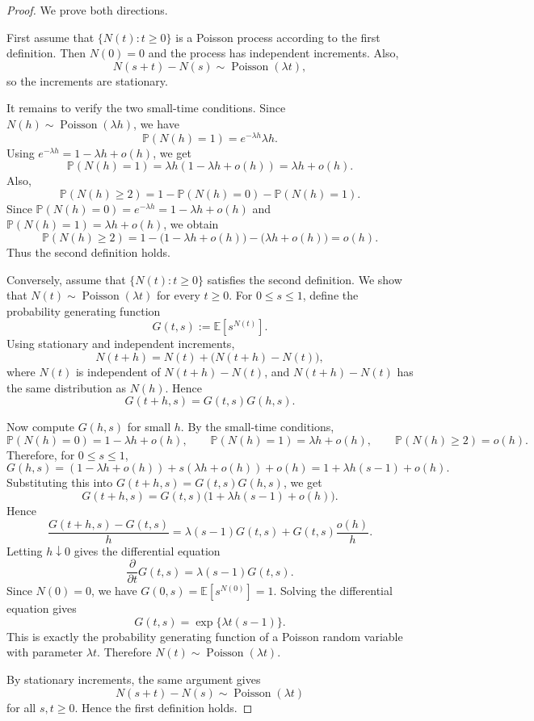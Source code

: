 \documentclass[11pt]{article}
\theoremstyle{plain}
\theoremstyle{definition}
\theoremstyle{remark}
\begin{document}
\begin{proof}
	We prove both directions.
	
	First assume that \(\{N(t):t\ge 0\}\) is a Poisson process according to the first definition. Then \(N(0)=0\) and the process has independent increments. Also,
	\[
	N(s+t)-N(s)
	\sim
	\operatorname{Poisson}(\lambda t),
	\]
	so the increments are stationary.
	
	It remains to verify the two small-time conditions. Since \(N(h)\sim \operatorname{Poisson}(\lambda h)\), we have
	\[
	\mathbb{P}(N(h)=1)=e^{-\lambda h}\lambda h.
	\]
	Using \(e^{-\lambda h}=1-\lambda h+o(h)\), we get
	\[
	\mathbb{P}(N(h)=1)
	=
	\lambda h(1-\lambda h+o(h))
	=
	\lambda h+o(h).
	\]
	Also,
	\[
	\mathbb{P}(N(h)\ge 2)
	=
	1-\mathbb{P}(N(h)=0)-\mathbb{P}(N(h)=1).
	\]
	Since \(\mathbb{P}(N(h)=0)=e^{-\lambda h}=1-\lambda h+o(h)\) and \(\mathbb{P}(N(h)=1)=\lambda h+o(h)\), we obtain
	\[
	\mathbb{P}(N(h)\ge 2)
	=
	1-\bigl(1-\lambda h+o(h)\bigr)-\bigl(\lambda h+o(h)\bigr)
	=
	o(h).
	\]
	Thus the second definition holds.
	
	Conversely, assume that \(\{N(t):t\ge 0\}\) satisfies the second definition. We show that \(N(t)\sim \operatorname{Poisson}(\lambda t)\) for every \(t\ge 0\). For \(0\le s\le 1\), define the probability generating function
	\[
	G(t,s):=\mathbb{E}[s^{N(t)}].
	\]
	Using stationary and independent increments,
	\[
	N(t+h)=N(t)+\bigl(N(t+h)-N(t)\bigr),
	\]
	where \(N(t)\) is independent of \(N(t+h)-N(t)\), and \(N(t+h)-N(t)\) has the same distribution as \(N(h)\). Hence
	\[
	G(t+h,s)=G(t,s)G(h,s).
	\]
	
	Now compute \(G(h,s)\) for small \(h\). By the small-time conditions,
	\[
	\mathbb{P}(N(h)=0)=1-\lambda h+o(h),
	\qquad
	\mathbb{P}(N(h)=1)=\lambda h+o(h),
	\qquad
	\mathbb{P}(N(h)\ge 2)=o(h).
	\]
	Therefore, for \(0\le s\le 1\),
	\[
	G(h,s)
	=
	(1-\lambda h+o(h))
	+
	s(\lambda h+o(h))
	+
	o(h)
	=
	1+\lambda h(s-1)+o(h).
	\]
	Substituting this into \(G(t+h,s)=G(t,s)G(h,s)\), we get
	\[
	G(t+h,s)
	=
	G(t,s)\bigl(1+\lambda h(s-1)+o(h)\bigr).
	\]
	Hence
	\[
	\frac{G(t+h,s)-G(t,s)}{h}
	=
	\lambda(s-1)G(t,s)+G(t,s)\frac{o(h)}{h}.
	\]
	Letting \(h\downarrow 0\) gives the differential equation
	\[
	\frac{\partial}{\partial t}G(t,s)=\lambda(s-1)G(t,s).
	\]
	Since \(N(0)=0\), we have \(G(0,s)=\mathbb{E}[s^{N(0)}]=1\). Solving the differential equation gives
	\[
	G(t,s)=\exp\{\lambda t(s-1)\}.
	\]
	This is exactly the probability generating function of a Poisson random variable with parameter \(\lambda t\). Therefore \(N(t)\sim \operatorname{Poisson}(\lambda t)\).
	
	By stationary increments, the same argument gives
	\[
	N(s+t)-N(s)
	\sim
	\operatorname{Poisson}(\lambda t)
	\]
	for all \(s,t\ge 0\). Hence the first definition holds.
\end{proof}
\end{document}
